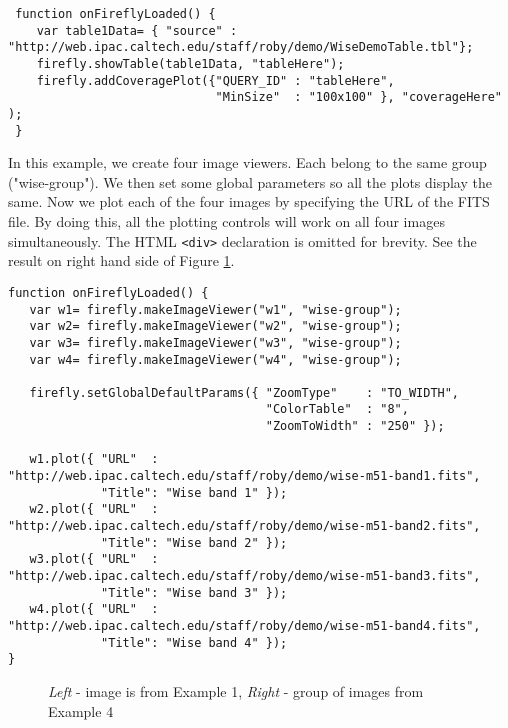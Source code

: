 \scriptsize
\begin{verbatim}
 function onFireflyLoaded() {
    var table1Data= { "source" : "http://web.ipac.caltech.edu/staff/roby/demo/WiseDemoTable.tbl"};
    firefly.showTable(table1Data, "tableHere");
    firefly.addCoveragePlot({"QUERY_ID" : "tableHere",
                             "MinSize"  : "100x100" }, "coverageHere" );
 }
\end{verbatim}
\normalsize

In this example, we create four image viewers. Each belong to the same group ("wise-group").  We then set some global parameters so all the plots display the same. Now we plot each of the four images by specifying the URL of the FITS file. By doing this, all the plotting controls will work on all four images simultaneously. The HTML \scriptsize\texttt{<div>} \normalsize declaration is omitted for brevity. See the result on right hand side of Figure \ref{examples14}.

\scriptsize
\begin{verbatim}
function onFireflyLoaded() {
   var w1= firefly.makeImageViewer("w1", "wise-group");
   var w2= firefly.makeImageViewer("w2", "wise-group");
   var w3= firefly.makeImageViewer("w3", "wise-group");
   var w4= firefly.makeImageViewer("w4", "wise-group");

   firefly.setGlobalDefaultParams({ "ZoomType"    : "TO_WIDTH",
                                    "ColorTable"  : "8",
                                    "ZoomToWidth" : "250" });

   w1.plot({ "URL"  : "http://web.ipac.caltech.edu/staff/roby/demo/wise-m51-band1.fits",
             "Title": "Wise band 1" });
   w2.plot({ "URL"  : "http://web.ipac.caltech.edu/staff/roby/demo/wise-m51-band2.fits",
             "Title": "Wise band 2" });
   w3.plot({ "URL"  : "http://web.ipac.caltech.edu/staff/roby/demo/wise-m51-band3.fits",
             "Title": "Wise band 3" });
   w4.plot({ "URL"  : "http://web.ipac.caltech.edu/staff/roby/demo/wise-m51-band4.fits",
             "Title": "Wise band 4" });
}
\end{verbatim}
\normalsize



\begin{figure}[!ht]
\caption{\small \textit{Left} - image is from Example 1, \textit{Right} - group of images from Example 4}
\label{examples14}
\end{figure}


